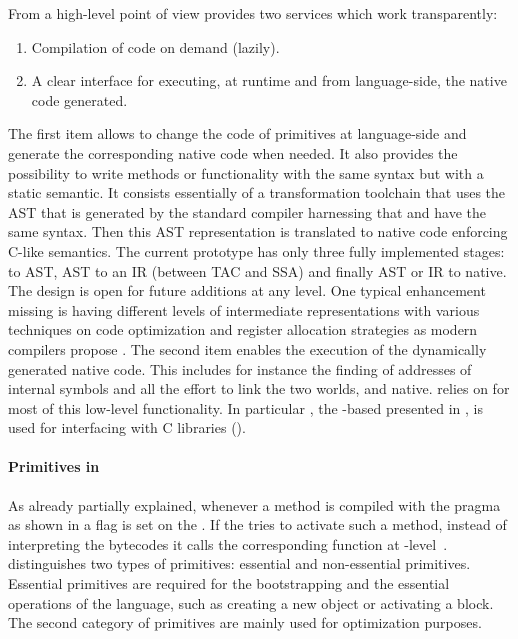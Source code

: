From a high-level point of view \WF provides two services which work transparently: 

\begin{enumerate}
	\item Compilation of \Slang code on demand (lazily).
	\item A clear interface for executing, at runtime and from language-side, the native code generated.
\end{enumerate}

\noindent The first item allows to change the code of primitives at language-side and generate the corresponding native code when needed. 
It also provides the possibility to write methods or functionality with the same \ST syntax but with a static semantic. 
It consists essentially of a transformation toolchain that uses the AST that is generated by the standard \PH compiler harnessing that \Slang and \ST have the same syntax. 
Then this AST representation is translated to native code enforcing C-like \Slang semantics. The current prototype has only three fully implemented stages: \Slang to AST, AST to an IR (between TAC and SSA) and finally AST or IR to native.
The design is open for future additions at any level.
One typical enhancement missing is having different levels of intermediate representations with various techniques on code optimization and register allocation strategies as modern compilers propose \cite[Ch.\ 1]{Appe98a}. 
The second item enables the execution of the dynamically generated native code.
This includes for instance the finding of addresses of \VM internal symbols and all the effort to link the two worlds, \ST and native.
\WF relies on \B for most of this low-level functionality.
In particular \NB, the \B-based \FFI presented in , is used for interfacing with C libraries (). 

\paragraph{Primitives in \ST}
As already partially explained, whenever a method is compiled with the  pragma as shown in  a flag is set on the . 
If the \VM tries to activate such a method, instead of interpreting the bytecodes it calls the corresponding function at \VM-level~\cite{Gold83a}.
\ST distinguishes two types of primitives: essential and non-essential primitives.
Essential primitives are required for the bootstrapping and the essential operations of the language, such as creating a new object or activating a block.
The second category of primitives are mainly used for optimization purposes.

